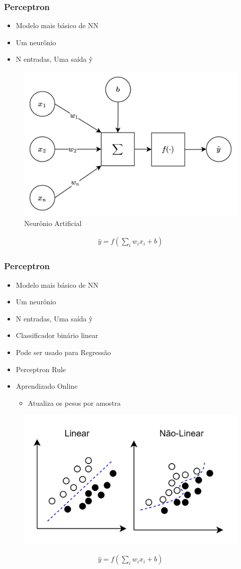 \documentclass{beamer}
\begin{document}
\begin{frame}
	\frametitle{Perceptron}
	\begin{itemize}
		\item Modelo mais básico de NN
		\item Um neurônio
		\item N entradas, Uma saída ŷ
	\end{itemize}
	\begin{figure}
		\centering
		\includegraphics[width=0.4\linewidth]{figures/neuron_ai}
		\caption{Neurônio Artificial}
	\end{figure}

	\begin{gather*}
		\hat{y} = f( \sum_i w_i x_i + b)
	\end{gather*}
\end{frame}
\begin{frame}
	\frametitle{Perceptron}
	\begin{itemize}
		\item Modelo mais básico de NN
		\item Um neurônio
		\item N entradas, Uma saída ŷ
		\item Classificador binário linear
		\item Pode ser usado para Regressão
		\item Perceptron Rule
		\item Aprendizado Online
		\begin{itemize}
			\item Atualiza os pesos por amostra
		\end{itemize}
	\end{itemize}
	\begin{figure}
		\centering
		\includegraphics[width=0.6\linewidth]{figures/linear_regression}
	\end{figure}
	
	\begin{gather*}
		\hat{y} = f( \sum_i w_i x_i + b)
	\end{gather*}
\end{frame}
\end{document}
